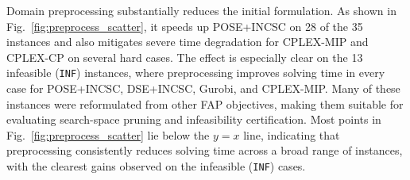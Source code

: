 \documentclass[letterpaper,journal]{IEEEtran}
\begin{document}
Domain preprocessing substantially reduces the initial formulation. As shown in Fig.~\ref{fig:preprocess_scatter}, it speeds up POSE+INCSC on 28 of the 35 instances and also mitigates severe time degradation for CPLEX-MIP and CPLEX-CP on several hard cases. The effect is especially clear on the 13 infeasible (\texttt{INF}) instances, where preprocessing improves solving time in every case for POSE+INCSC, DSE+INCSC, Gurobi, and CPLEX-MIP. Many of these instances were reformulated from other FAP objectives, making them suitable for evaluating search-space pruning and infeasibility certification. 
Most points in Fig.~\ref{fig:preprocess_scatter} lie below the $y=x$ line, indicating that preprocessing consistently reduces solving time across a broad range of instances, with the clearest gains observed on the infeasible (\texttt{INF}) cases.
\end{document}

